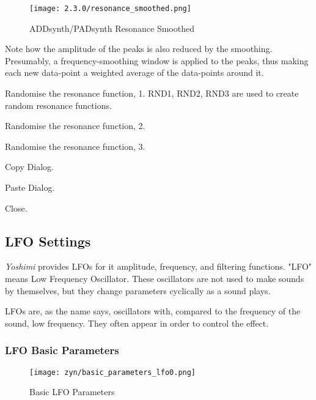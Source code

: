 \begin{figure}[H]
   \centering
   \texttt{[image: 2.3.0/resonance\_smoothed.png]}
   \caption{ADDsynth/PADsynth Resonance Smoothed}
   \label{fig:addsynth_resonance_smoothed}
\end{figure}

   Note how the amplitude of the peaks is also reduced by the smoothing.
   Presumably, a frequency-smoothing window is applied to the peaks, thus making
   each new data-point a weighted average of the data-points around it.

   Randomise the resonance function, 1.
   RND1, RND2, RND3 are used to create random resonance functions.

   Randomise the resonance function, 2.

   Randomise the resonance function, 3.

   Copy Dialog.

   Paste Dialog.

   Close.

\subsection{LFO Settings}
\label{subsec:lfo_settings}

   \textsl{Yoshimi} provides LFOs for it amplitude, frequency, and filtering
   functions.
   "LFO" means Low Frequency Oscillator. These oscillators are not used to make
   sounds by themselves, but they change parameters cyclically as a sound
   plays.

   LFOs are, as the name says, oscillators with, compared to the frequency of
   the sound, low frequency. They often appear in order to control the
   effect.

\subsubsection{LFO Basic Parameters}
\label{subsubsec:lfo_basic_parameters}

\begin{figure}[H]
   \centering
   \texttt{[image: zyn/basic\_parameters\_lfo0.png]}
   \caption[Basic LFO Parameters]{Basic LFO Parameters}
   \label{fig:basic_parameters_lfo}
\end{figure}

